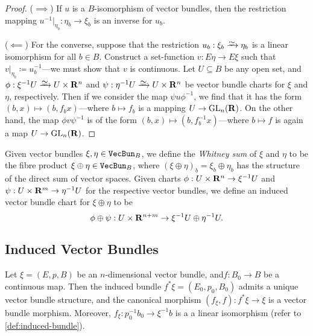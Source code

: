 \documentclass[../../../deep-dive]{subfile}
\begin{document}
\begin{proof}
(\(\implies\)) If \(u\) is a \(B\)-isomorphism of vector bundles, then the
restriction mapping \(u^{-1}|_{\eta_b}: \eta_b \to \xi_b\) is an inverse for
\(u_b\).

(\(\impliedby\)) For the converse, suppose that the restriction
\(u_b: \xi_b \isoto \eta_b\) is a linear isomorphism for all \(b \in
B\). Construct a set-function \(v: E \eta \to E \xi\) such that
\(v|_{\eta_b} \coloneq u_b^{-1}\)---we must show that \(v\) is continuous. Let
\(U \subseteq B\) be any open set, and \(\phi: \xi^{-1} U \isoto U \times \R^n\)
and \(\psi: \eta^{-1} U \isoto U \times \R^n\) be vector bundle charts for
\(\xi\) and \(\eta\), respectively. Then if we consider the map
\(\psi u \phi^{-1}\), we find that it has the form
\((b, x) \mapsto (b, f_b x)\)---where \(b \mapsto f_b\) is a mapping
\(U \to \operatorname{GL}_n(\mathbf{R})\). On the other hand, the map \(\phi v \psi^{-1}\) is of the
form \((b, x) \mapsto (b, f_b^{-1} x)\)---where \(b \mapsto f\) is again a map
\(U \to \operatorname{GL}_n(\mathbf{R})\).
\end{proof}

\begin{definition}
\label{def:whitney-sum}
Given vector bundles \(\xi, \eta \in {\texttt{VecBun}}_B\), we define the \emph{Whitney
  sum} of \(\xi\) and \(\eta\) to be the fibre product
\(\xi \oplus \eta \in {\texttt{VecBun}}_B\), where
\((\xi \oplus \eta)_b = \xi_b \oplus \eta_b\) has the structure of the direct
sum of vector spaces. Given charts \(\phi: U \times \mathbf{R}^n \to \xi^{-1} U\) and
\(\psi: U \times \mathbf{R}^m \to \eta^{-1} U\) for the respective vector bundles, we
define an induced vector bundle chart for \(\xi \oplus \eta\) to be
\[
\phi \oplus \psi: U \times \mathbf{R}^{n+m} \to \xi^{-1} U \oplus \eta^{-1} U.
\]

\end{definition}

\subsection{Induced Vector Bundles}

\begin{proposition}
\label{prop:induced-vector-bundle}
Let \(\xi = (E, p, B)\) be an \(n\)-dimensional vector bundle,
and\(f: B_0 \to B\) be a continuous map. Then the induced bundle
\(f^{*} \xi = (E_0, p_0, B_0)\) admits a unique vector bundle structure, and the
canonical morphism \((f_{\xi}, f): f^{*} \xi \to \xi\) is a vector bundle
morphism. Moreover, \(f_{\xi}: p_0^{-1} b_0 \to \xi^{-1} b\) is a a linear
isomorphism (refer to \cref{def:induced-bundle}).
\end{proposition}
\end{document}
